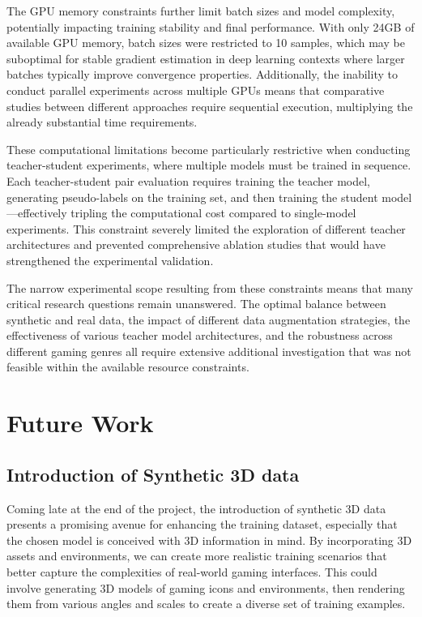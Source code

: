 The GPU memory constraints further limit batch sizes and model complexity,
potentially impacting training stability and final performance. With only 24GB
of available GPU memory, batch sizes were restricted to 10 samples, which may
be suboptimal for stable gradient estimation in deep learning contexts where
larger batches typically improve convergence properties. Additionally, the
inability to conduct parallel experiments across multiple GPUs means that
comparative studies between different approaches require sequential execution,
multiplying the already substantial time requirements.

These computational limitations become particularly restrictive when conducting
teacher-student experiments, where multiple models must be trained in sequence.
Each teacher-student pair evaluation requires training the teacher model,
generating pseudo-labels on the training set, and then training the student
model—effectively tripling the computational cost compared to single-model
experiments. This constraint severely limited the exploration of different
teacher architectures and prevented comprehensive ablation studies that would
have strengthened the experimental validation.

The narrow experimental scope resulting from these constraints means that many
critical research questions remain unanswered. The optimal balance between
synthetic and real data, the impact of different data augmentation strategies,
the effectiveness of various teacher model architectures, and the robustness
across different gaming genres all require extensive additional investigation
that was not feasible within the available resource constraints.
\section{Future Work}
\subsection{Introduction of Synthetic 3D data}
Coming late at the end of the project, the introduction of synthetic 3D data
presents a promising avenue for enhancing the training dataset, especially that
the chosen model is conceived with 3D information in mind. By incorporating 3D
assets and environments, we can create more realistic training scenarios that
better capture the complexities of real-world gaming interfaces. This could
involve generating 3D models of gaming icons and environments, then rendering
them from various angles and scales to create a diverse set of training
examples.
